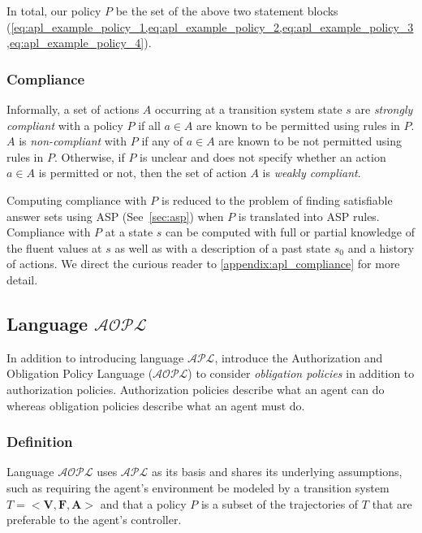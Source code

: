 In total, our policy $P$ be the set of the above two statement blocks (\cref{eq:apl_example_policy_1,eq:apl_example_policy_2,eq:apl_example_policy_3,eq:apl_example_policy_4}).

\subsubsection{Compliance}

Informally, a set of actions $A$ occurring at a transition system state $s$ are \textit{strongly compliant} with a policy $P$ if all $a \in A$ are known to be permitted using rules in $P$.
$A$ is \textit{non-compliant} with $P$ if any of $a \in A$ are known to be not permitted using rules in $P$.
Otherwise, if $P$ is unclear and does not specify whether an action $a \in A$ is permitted or not, then the set of action $A$ is \textit{weakly compliant}.

Computing compliance with $P$ is reduced to the problem of finding satisfiable answer sets using ASP (See~\cref{sec:asp}) when $P$ is translated into ASP rules.
Compliance with $P$ at a state $s$ can be computed with full or partial knowledge of the fluent values at $s$ as well as with a description of a past state $s_0$ and a history of actions.
We direct the curious reader to \cref{appendix:apl_compliance} for more detail.

\subsection{Language $\mathcal{AOPL}$}
\label{subsec:aopl}

In addition to introducing language $\mathcal{APL}$, \citet{gelfond_authorization_2008} introduce the Authorization and Obligation Policy Language ($\mathcal{AOPL}$) to consider \textit{obligation policies} in addition to authorization policies.
Authorization policies describe what an agent can do whereas obligation policies describe what an agent must do.

\subsubsection{Definition}

Language $\mathcal{AOPL}$ uses $\mathcal{APL}$ as its basis and shares its underlying assumptions, such as requiring the agent's environment be modeled by a transition system $T=<\boldsymbol{V}, \boldsymbol{F}, \boldsymbol{A}>$ and that a policy $P$ is a subset of the trajectories of $T$ that are preferable to the agent's controller.

